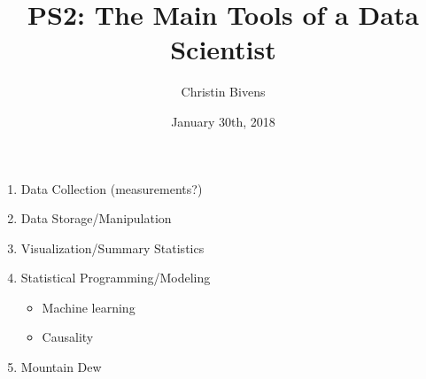 \documentclass{article}
\title{PS2: The Main Tools of a Data Scientist }
\author{Christin Bivens}
\date{January 30th, 2018}
\begin{document}
\maketitle

\begin{enumerate}
    \item Data Collection (measurements?)
    \item Data Storage/Manipulation
    \item Visualization/Summary Statistics
    \item Statistical Programming/Modeling
    \begin{itemize}
        \item Machine learning
        \item Causality
    \end{itemize}
    \item Mountain Dew
\end{enumerate}
\end{document}

